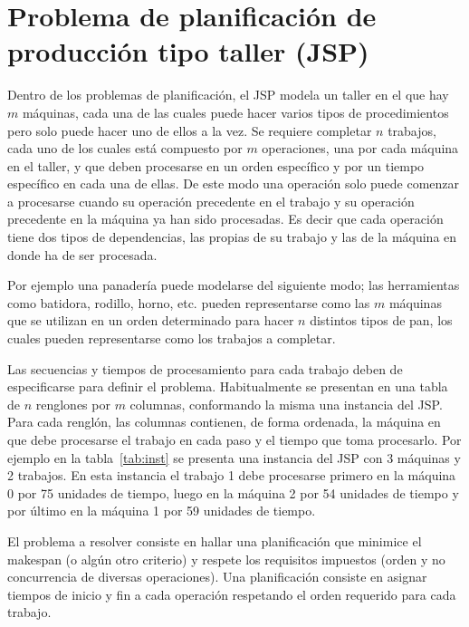\section{Problema de planificación de producción tipo taller (JSP)}

Dentro de los problemas de planificación, el JSP modela un taller en el que hay $m$ máquinas, cada una de las cuales puede hacer varios tipos 
de procedimientos pero solo puede hacer uno de ellos a la vez. 
%
Se requiere completar $n$ trabajos, cada uno de los cuales está compuesto por $m$ operaciones, una por cada máquina en el taller, y que deben 
procesarse en un orden específico y por un tiempo específico en cada una de ellas. De este modo una operación solo puede comenzar a procesarse cuando su operación precedente en el trabajo y su operación precedente en la máquina ya han sido procesadas. Es decir que cada operación tiene dos tipos de dependencias, las propias de su trabajo y las de la máquina en donde ha de ser procesada.

Por ejemplo una panadería puede modelarse del siguiente modo; las herramientas como batidora, rodillo, horno, etc. pueden representarse como las
$m$ máquinas que se utilizan en un orden determinado para hacer $n$ distintos tipos de pan, los cuales pueden representarse como los trabajos 
a completar.

Las secuencias y tiempos de procesamiento para cada trabajo deben de especificarse para definir el problema. 
%
Habitualmente se presentan en una tabla de $n$ renglones por $m$ columnas, conformando la misma una instancia del JSP. 
%
Para cada renglón, las columnas contienen, de forma ordenada, la máquina en que debe procesarse el trabajo en cada paso y el tiempo 
que toma procesarlo. 
%
Por ejemplo en la tabla~\ref{tab:inst} se presenta una instancia del JSP con 3 máquinas y 2 trabajos. 
%
En esta instancia el trabajo 1 debe procesarse primero en la máquina 0 por 75 unidades de tiempo, luego en la máquina 2 por 54 unidades de tiempo y 
por último en la máquina 1 por 59 unidades de tiempo.

El problema a resolver consiste en hallar una planificación que minimice el makespan (o algún otro criterio) y respete los requisitos impuestos (orden y no concurrencia de diversas
operaciones).
%
Una planificación consiste en asignar tiempos de inicio y fin a cada operación respetando el orden requerido para cada trabajo. 

